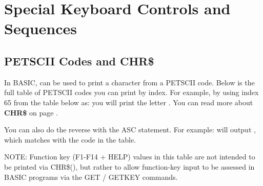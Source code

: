 \chapter{Special Keyboard Controls and Sequences}


\section{PETSCII Codes and CHR\$}

\label{appendix:asciicodes}

In BASIC,   can be used to print a character from a PETSCII code.
Below is the full table of PETSCII codes you can print by index.  For example, by
using index 65 from the table below as:  you will
print the letter . You can read more about {\bf CHR\$} on page \pageref{chrcommand}.

You can also do the reverse with the ASC statement.  For example:
 will output , which matches with the
code in the table.

NOTE: Function key (F1-F14 + HELP) values in this table are not intended to be printed via CHR\$(),
but rather to allow function-key input to be assessed in BASIC programs via the GET / GETKEY commands.

